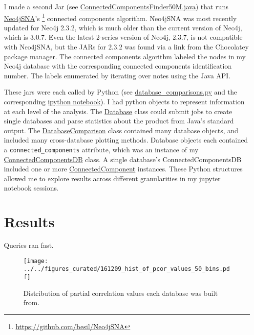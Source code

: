 \documentclass[12pt]{article}
\begin{document}
I made a second Jar (see \href{https://github.com/JanetMatsen/Neo4j_meta4/blob/master/data_mining_Neo4j_v2_3_2/src/ConnectedComponentsFinder50M.java}{ConnectedComponentsFinder50M.java}) that runs \href{https://github.com/besil/Neo4jSNA}{Neo4jSNA}'s \footnote{\url{https://github.com/besil/Neo4jSNA}} connected components algorithm.
Neo4jSNA was most recently updated for Neo4j 2.3.2, which is much older than the current version of Neo4j, which is 3.0.7. 
Even the latest 2-series version of Neo4j, 2.3.7, is not compatible with Neo4jSNA, but the JARs for 2.3.2 was found via a link from the Chocolatey package manager.
The connected components algorithm labeled the nodes in my Neo4j database with the corresponding connected components identification number.
The labels enumerated by iterating over notes using the Java API.

These jars were each called by Python (see \href{https://github.com/JanetMatsen/Neo4j_meta4/blob/master/code/database_comparisons.py}{database\_comparisons.py} and the corresponding \href{https://github.com/JanetMatsen/Neo4j_meta4/blob/master/jupyter/build_graphs_and_find_connected_components_50M.ipynb}{ipython notebook}).
I had python objects to represent information at each level of the analysis.  
The \href{https://github.com/JanetMatsen/Neo4j_meta4/blob/master/code/database_comparisons.py}{Database} class could submit jobs to create single databases and parse statistics about the product from Java's standard output.
The \href{https://github.com/JanetMatsen/Neo4j_meta4/blob/master/code/database_comparisons.py}{DatabaseComparison} class contained many database objects, and included many cross-database plotting methods.
Database objects each contained a \texttt{connected\_components} attribute, which was an instance of my \href{https://github.com/JanetMatsen/Neo4j_meta4/blob/master/code/connected_component.py}{ConnectedComponentsDB} class.
A single database's ConnectedComponentsDB included one or more \href{https://github.com/JanetMatsen/Neo4j_meta4/blob/master/code/connected_component.py}{ConnectedComponent} instances.
These Python structures allowed me to explore results across different granularities in my jupyter notebook sessions.

\section{Results}  

Queries ran fast. 

\begin{figure}[H]
    \captionsetup{width=0.6\textwidth}
    \centering
    \texttt{[image: ../../figures\_curated/161209\_hist\_of\_pcor\_values\_50\_bins.pdf]}
    \caption{Distribution of partial correlation values each database was built from.}
\end{figure}
\end{document}
